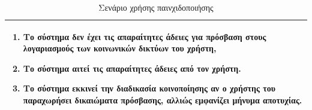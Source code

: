 \begin{table}[H]
\begin{center}
\begin{tabular}{|p{\dimexpr \linewidth-2\tabcolsep}|}
		\begin{enumerate}
			\item Το σύστημα δεν έχει τις απαραίτητες άδειες για πρόσβαση στους λογαριασμούς των κοινωνικών δικτύων του χρήστη,
			\item Το σύστημα αιτεί τις απαραίτητες άδειες από τον χρήστη.
			\item Το σύστημα εκκινεί την διαδικασία κοινοποίησης αν ο χρήστης του παραχωρήσει δικαιώματα πρόσβασης, αλλιώς εμφανίζει μήνυμα αποτυχίας.
		\end{enumerate}
		\\ \hline
	    \end{tabular}
	    \caption{Σενάριο χρήσης παινχιδοποιήσης}
	    \label{tab:use_case_gamification} 
	\end{center}
\end{table}


